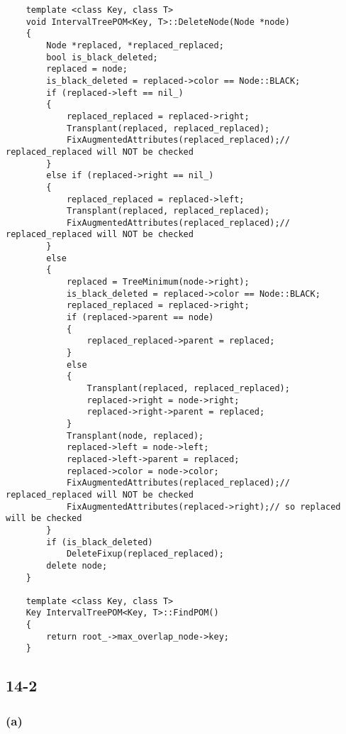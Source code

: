 \begin{verbatim}
    template <class Key, class T>
    void IntervalTreePOM<Key, T>::DeleteNode(Node *node)
    {
        Node *replaced, *replaced_replaced;
        bool is_black_deleted;
        replaced = node;
        is_black_deleted = replaced->color == Node::BLACK;
        if (replaced->left == nil_)
        {
            replaced_replaced = replaced->right;
            Transplant(replaced, replaced_replaced);
            FixAugmentedAttributes(replaced_replaced);// replaced_replaced will NOT be checked
        }
        else if (replaced->right == nil_)
        {
            replaced_replaced = replaced->left;
            Transplant(replaced, replaced_replaced);
            FixAugmentedAttributes(replaced_replaced);// replaced_replaced will NOT be checked
        }
        else
        {
            replaced = TreeMinimum(node->right);
            is_black_deleted = replaced->color == Node::BLACK;
            replaced_replaced = replaced->right;
            if (replaced->parent == node)
            {
                replaced_replaced->parent = replaced;
            }
            else
            {
                Transplant(replaced, replaced_replaced);
                replaced->right = node->right;
                replaced->right->parent = replaced;
            }
            Transplant(node, replaced);
            replaced->left = node->left;
            replaced->left->parent = replaced;
            replaced->color = node->color;
            FixAugmentedAttributes(replaced_replaced);// replaced_replaced will NOT be checked
            FixAugmentedAttributes(replaced->right);// so replaced will be checked
        }
        if (is_black_deleted)
            DeleteFixup(replaced_replaced);
        delete node;
    }

    template <class Key, class T>
    Key IntervalTreePOM<Key, T>::FindPOM()
    {
        return root_->max_overlap_node->key;
    }
\end{verbatim}

\subsection*{14-2}

\subsubsection*{(a)}

